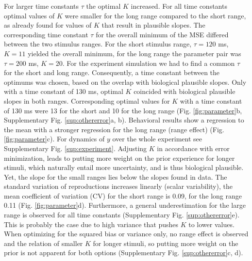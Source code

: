 \documentclass[10pt]{article}
\begin{document}
For larger time constants $\tau$ the optimal $K$ increased. For all time constants optimal values of $K$ were smaller for the long range compared to the short range, as already found for values of $K$ that result in plausible slopes.
The corresponding time constant $\tau$ for the overall minimum of the MSE differed between the two stimulus ranges. For the short stimulus range, $\tau = 120$ ms, $K = 11$ yielded the overall minimum, for the long range the parameter pair was $\tau = 200$ ms, $K = 20$. 
For the experiment simulation we had to find a common $\tau$ for the short and long range. Consequently, a time constant between the optimums was chosen, based on the overlap with biological plausible slopes. Only with a time constant of 130 ms, optimal $K$ coincided with biological plausible slopes in both ranges. 
Corresponding optimal values for $K$ with a time constant of 130 ms were 13 for the short and 10 for the long range (Fig. \ref{fig:parameter}b, Supplementary Fig. \ref{sup:othererror}a, b).
Behavioral results show a regression to the mean with a stronger regression for the long range (range effect) (Fig. \ref{fig:parameter}c). For dynamics of $y$ over the whole experiment see Supplementary Fig. \ref{sup:experiment}.
Adjusting $K$ in accordance with error minimization, leads to putting more weight on the prior experience for longer stimuli, which naturally entail more uncertainty, and is thus biological plausible.
Yet, the slope for the small ranges lies below the slopes found in data. 
The standard variation of reproductions increases linearly (scalar variability), the mean coefficient of variation (CV) for the short range is 0.09, for the long range 0.11 (Fig. \ref{fig:parameter}d).
Furthermore, a general underestimation for the large range is observed for all time constants (Supplementary Fig. \ref{sup:othererror}e). This is probably the case due to high variance that pushes $K$ to lower values.
When optimizing for the squared bias or variance only, no range effect is observed and the relation of smaller $K$ for longer stimuli, so putting more weight on the prior is not apparent for both options (Supplementary Fig. \ref{sup:othererror}c, d).  
\end{document}
